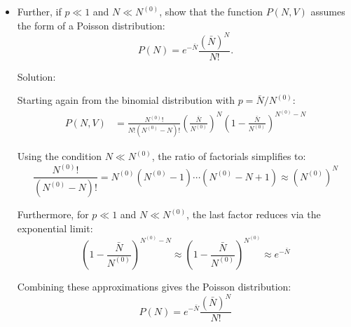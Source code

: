 \begin{homeworkProblem}
\begin{itemize}
\begin{callout}{Solution:}
Higher orders:
\begin{align*}
    \frac{\partial \ln P}{\partial N} &= -\ln N + \ln(N^{(0)}-N) + \ln p - \ln q \\
    \frac{\partial^2 \ln P}{\partial N^2} &= \frac{\partial}{\partial N}\Big[-\ln N + \ln(N^{(0)}-N) + \ln p - \ln q\Big] \\
    &= -\frac{1}{N} + \frac{\partial}{\partial N}\ln(N^{(0)}-N) \\
    &= -\frac{1}{N} - \frac{1}{N^{(0)}-N} \\[4pt]
    \left.\frac{\partial^2 \ln P}{\partial N^2}\right|_{N=\bar N} 
        &= -\frac{1}{N^{(0)}p} - \frac{1}{N^{(0)}(1-p)}  \\
    &= -\frac{1}{N^{(0)}}\left(\frac{1}{p}+\frac{1}{q}\right) \\
    &= -\frac{1}{N^{(0)}}\cdot\frac{p+q}{pq} \\
    &= -\frac{1}{N^{(0)}pq} \\
\end{align*}

\begin{align*}
        \ln P(N,V) &\approx \ln P(\bar{N},V) - \frac{(N-\bar{N})^2}{2N^{(0)}pq}
    \end{align*}
            \end{callout}
        \item[(c)] Further, if $p \ll 1$ and $N \ll N^{(0)}$, show that the function $P(N, V)$ assumes the form of a Poisson distribution:
            $$ P(N)=e^{-\bar{N}} \frac{(\bar{N})^N}{N!} . $$
            \begin{callout}{Solution:}

                Starting again from the binomial distribution with $p = \bar{N}/N^{(0)}$:
                \begin{align*}
                    P(N,V) &= \frac{N^{(0)}!}{N!(N^{(0)}-N)!} \left(\frac{\bar{N}}{N^{(0)}}\right)^N \left(1 - \frac{\bar{N}}{N^{(0)}}\right)^{N^{(0)}-N}
                \end{align*}

                Using the condition $N \ll N^{(0)}$, the ratio of factorials simplifies to:
                \[
                    \frac{N^{(0)}!}{(N^{(0)}-N)!} = N^{(0)}(N^{(0)}-1)\cdots(N^{(0)}-N+1) \approx (N^{(0)})^N
                \]

                Furthermore, for $p \ll 1$ and $N \ll N^{(0)}$, the last factor reduces via the exponential limit:
                \[
                    \left(1 - \frac{\bar{N}}{N^{(0)}}\right)^{N^{(0)}-N} \approx \left(1 - \frac{\bar{N}}{N^{(0)}}\right)^{N^{(0)}} \approx e^{-\bar{N}}
                \]

                Combining these approximations gives the Poisson distribution:
                \[
                    P(N) = e^{-\bar{N}} \frac{(\bar{N})^N}{N!}
                \]

            \end{callout}
    \end{itemize}

\end{homeworkProblem}

